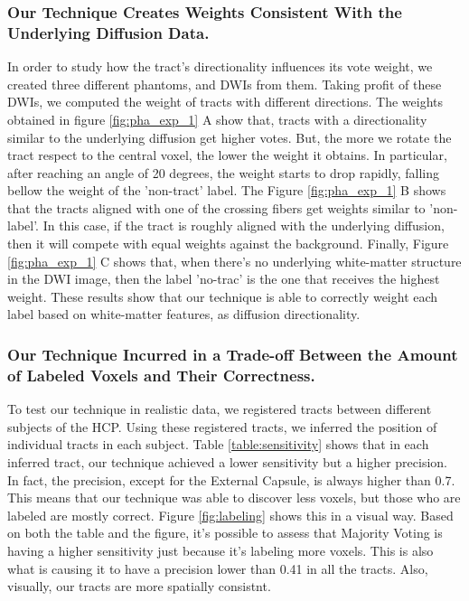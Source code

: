 \subsubsection{Our Technique Creates Weights Consistent With the Underlying
               Diffusion Data.}
In order to study how the tract's directionality influences its vote weight,
we created three different phantoms, and DWIs from them. Taking profit of 
these DWIs, we computed the weight of tracts with different directions. 
The weights obtained in figure \ref{fig:pha_exp_1} A show that, tracts
with a directionality similar to the underlying diffusion get higher votes.
But, the more we rotate the tract respect to the central voxel, the lower the
weight it obtains. In particular, after reaching an angle of 20 degrees, the
weight starts to drop rapidly, falling bellow the weight of the 'non-tract' label.
The Figure \ref{fig:pha_exp_1} B shows that the tracts aligned with one of the 
crossing fibers get weights similar to 'non-label'. In this case, if the tract
is roughly aligned with the underlying diffusion, then it will compete with
equal weights against the background. Finally, Figure \ref{fig:pha_exp_1} C
shows that, when there's no underlying white-matter structure in the DWI image,
then the label 'no-trac' is the one that receives the highest weight. These
results show that our technique is able to correctly weight each label based
on white-matter features, as diffusion directionality.

\subsubsection{Our Technique Incurred in a Trade-off Between the Amount of
               Labeled Voxels and Their Correctness.}
To test our technique in realistic data, we registered tracts between different
subjects of the HCP. Using these registered tracts, we inferred the position
of individual tracts in each subject. Table \ref{table:sensitivity} shows that
in each inferred tract, our technique achieved a lower sensitivity but a higher
precision. In fact, the precision, except for the External Capsule, is always
higher than 0.7. This means that our technique was able to discover less voxels,
but those who are labeled are mostly correct. Figure \ref{fig:labeling} shows
this in a visual way. Based on both the table and the figure, it's possible
to assess that Majority Voting is having a higher sensitivity just because
it's labeling more voxels. This is also what is causing it to have a precision
lower than 0.41 in all the tracts. Also, visually, our tracts are more spatially consistnt.


